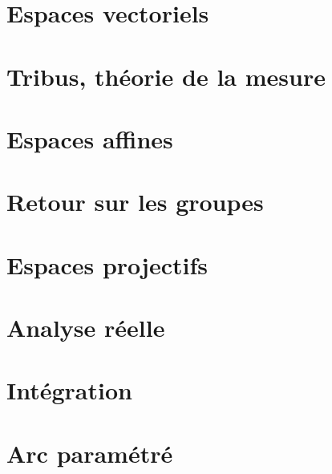 \chapter{Espaces vectoriels}







\chapter{Tribus, théorie de la mesure}





\chapter{Espaces affines}


\chapter{Retour sur les groupes}




\chapter{Espaces projectifs}


\chapter{Analyse réelle}







\chapter{Intégration}






\chapter{Arc paramétré}


